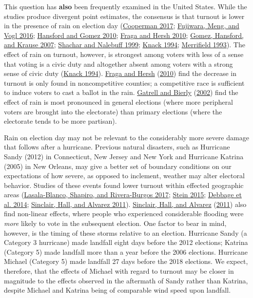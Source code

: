 \documentclass[
  12pt,
]{article}
\begin{document}
This question has \textbf{also} been frequently examined in the United States. While the studies produce divergent point estimates, the consensus is that turnout is lower in the presence of rain on election day (\protect\hyperlink{ref-Cooperman2017}{Cooperman 2017}; \protect\hyperlink{ref-Fujiwara2016}{Fujiwara, Meng, and Vogl 2016}; \protect\hyperlink{ref-Hansford2010}{Hansford and Gomez 2010}; \protect\hyperlink{ref-Fraga2010}{Fraga and Hersh 2010}; \protect\hyperlink{ref-Gomez2007}{Gomez, Hansford, and Krause 2007}; \protect\hyperlink{ref-Shachar1999}{Shachar and Nalebuff 1999}; \protect\hyperlink{ref-Knack1994}{Knack 1994}; \protect\hyperlink{ref-Merrifield1993}{Merrifield 1993}). The effect of rain on turnout, however, is strongest among voters with less of a sense that voting is a civic duty and altogether absent among voters with a strong sense of civic duty (\protect\hyperlink{ref-Knack1994}{Knack 1994}). \protect\hyperlink{ref-Fraga2010}{Fraga and Hersh} (\protect\hyperlink{ref-Fraga2010}{2010}) find the decrease in turnout is only found in noncompetitive counties; a competitive race is sufficient to induce voters to cast a ballot in the rain. \protect\hyperlink{ref-Gatrell2002}{Gatrell and Bierly} (\protect\hyperlink{ref-Gatrell2002}{2002}) find the effect of rain is most pronounced in general elections (where more peripheral voters are brought into the electorate) than primary elections (where the electorate tends to be more partisan).

Rain on election day may not be relevant to the considerably more severe damage that follows after a hurricane. Previous natural disasters, such as Hurricane Sandy (2012) in Connecticut, New Jersey and New York and Hurricane Katrina (2005) in New Orleans, may give a better set of boundary conditions on our expectations of how severe, as opposed to inclement, weather may alter electoral behavior. Studies of these events found lower turnout within effected geographic areas (\protect\hyperlink{ref-Lasala-Blanco2017}{Lasala-Blanco, Shapiro, and Rivera-Burgos 2017}; \protect\hyperlink{ref-Stein2015}{Stein 2015}; \protect\hyperlink{ref-Debbage2014}{Debbage et al. 2014}; \protect\hyperlink{ref-Sinclair2011}{Sinclair, Hall, and Alvarez 2011}). \protect\hyperlink{ref-Sinclair2011}{Sinclair, Hall, and Alvarez} (\protect\hyperlink{ref-Sinclair2011}{2011}) also find non-linear effects, where people who experienced considerable flooding were \emph{more} likely to vote in the subsequent election. One factor to bear in mind, however, is the timing of these storms relative to an election. Hurricane Sandy (a Category 3 hurricane) made landfall eight days before the 2012 elections; Katrina (Category 5) made landfall more than a year before the 2006 elections. Hurricane Michael (Category 5) made landfall 27 days before the 2018 elections. We expect, therefore, that the effects of Michael with regard to turnout may be closer in magnitude to the effects observed in the aftermath of Sandy rather than Katrina, despite Michael and Katrina being of comparable wind speed upon landfall.
\end{document}
